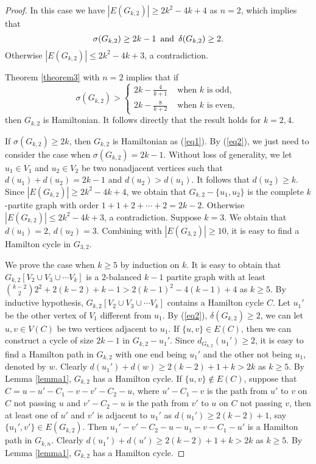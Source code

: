 \documentclass[reqno]{amsart}
\begin{document}
\begin{proof} In this case we have $|E(G_{k,2})| \geq 2k^2-4k+4$ as $n=2$, which implies that
 \begin{equation}\label{eq2}
 \sigma (G_{k,2}) \geq 2k-1 \text{\, and\, } \delta (G_{k,2}) \geq 2.
\end{equation}
Otherwise $|E(G_{k,2})| \leq  2k^2-4k+3$, a contradiction.


Theorem \ref{theorem3} with $n=2$ implies that if
\begin{equation}\label{eq1}
 \sigma (G_{k,2}) >\left\{\begin{array}{ll}
   2k-\frac{4}{k+1} & \text { when } k \text { is odd, }  \\
   2k-\frac{8}{k+2}  & \text { when } k \text { is even, }
 \end{array}\right.
\end{equation}
then $G_{k,2}$ is Hamiltonian.
It follows directly that the result holds for $k=2,4$.

If $\sigma (G_{k,2}) \geq 2k$, then  $ G_{k,2}$ is Hamiltonian as (\ref{eq1}). By (\ref{eq2}),  we just need to consider the case when $ \sigma (G_{k,2}) =2k-1$.  Without loss of generality, we let  $ u_1 \in V_1$ and $ u_2 \in V_{2}$ be two nonadjacent vertices  such that $ d(u_1)+d(u_2)=2k-1$ and $d(u_2) > d(u_1)$. It follows that $d(u_2) \geq k$. Since $|E(G_{k,2})| \geq 2k^2-4k+4$, we obtain that $G_{k,2}-\{u_1,u_2\}$ is the complete $k$-partite  graph with order $1+1+2+\cdots+2=2k-2$. Otherwise $|E(G_{k,2})| \leq 2k^2-4k+3$, a contradiction. Suppose $k=3$. We obtain that $d(u_1)=2$, $d(u_2)=3$.  Combining with  $|E(G_{3,2})| \geq  10$, it is easy to find a Hamilton cycle in $G_{3,2}$.

We prove the case when $k \geq 5$ by induction on $k$.  It is easy to obtain that  $G_{k,2}[V_2\cup V_3\cup\cdots V_k]$ is a 2-balanced $k-1$ partite graph with at least $\binom{k-2}{2}2^2+2(k-2)+k-1  > 2(k-1)^2-4(k-1)+4 $ as $k \geq 5$. By inductive hypothesis, $G_{k,2}[V_2\cup V_3\cup\cdots V_k]$ contains a Hamilton cycle $C$. Let $u_1'$ be the other vertex of $V_1$ different from $u_1$.   By (\ref{eq2}),  $\delta (G_{k,2}) \geq 2$,  we can let $u, v \in V(C)$ be two vertices adjacent to $u_1$.  If $\{u,v\}\in E(C)$, then we can construct a cycle of size $2k-1$ in $G_{k,2}-u_1'$. Since $d_{G_{k,2}}(u_1') \geq 2$, it is easy to find a Hamilton path in $G_{k,2}$ with one end being $u_1'$ and the other not being $u_1$, denoted by $w$. Clearly $d(u_1')+d(w) \geq 2(k-2)+1+k > 2k$ as $k \geq 5$. By Lemma \ref{lemma1}, $G_{k,2}$ has a Hamilton cycle. If $\{u,v\}\notin E(C)$, suppose that $C=u-u'-C_1-v-v'-C_2-u$, where $u'-C_1-v$ is the path from $u'$ to $v$ on $C$ not passing $u$ and  $v'-C_2-u$ is the path from $v'$ to $u$ on $C$ not passing $v$,   then at least one of $u'$ and $v'$ is adjacent to $u_1'$ as $d(u_1') \geq 2(k-2)+1$, say $\{u_1',v'\}\in E(G_{k,2})$. Then $u_1'-v'-C_2-u-u_1-v-C_1-u'$ is a Hamilton path in $G_{k,n}$.  Clearly $d(u_1')+d(u') \geq 2(k-2)+1+k > 2k$ as $k \geq 5$. By Lemma \ref{lemma1}, $G_{k,2}$ has a Hamilton cycle.
\end{proof}
\end{document}
